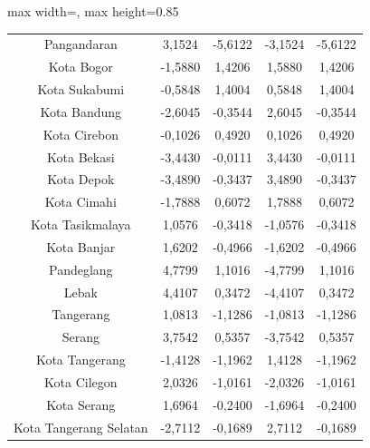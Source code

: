 \begin{table}[H]
\begin{adjustbox}{max width=\textwidth, max height=0.85\textheight}
\begin{tabular}{|c|c|c|c|c|}
Pangandaran & 3,1524 & -5,6122 & -3,1524 & -5,6122 \\
Kota Bogor & -1,5880 & 1,4206 & 1,5880 & 1,4206 \\
Kota Sukabumi & -0,5848 & 1,4004 & 0,5848 & 1,4004 \\
Kota Bandung & -2,6045 & -0,3544 & 2,6045 & -0,3544 \\
Kota Cirebon & -0,1026 & 0,4920 & 0,1026 & 0,4920 \\
Kota Bekasi & -3,4430 & -0,0111 & 3,4430 & -0,0111 \\
Kota Depok & -3,4890 & -0,3437 & 3,4890 & -0,3437 \\
Kota Cimahi & -1,7888 & 0,6072 & 1,7888 & 0,6072 \\
Kota Tasikmalaya & 1,0576 & -0,3418 & -1,0576 & -0,3418 \\
Kota Banjar & 1,6202 & -0,4966 & -1,6202 & -0,4966 \\
Pandeglang & 4,7799 & 1,1016 & -4,7799 & 1,1016 \\
Lebak & 4,4107 & 0,3472 & -4,4107 & 0,3472 \\
Tangerang & 1,0813 & -1,1286 & -1,0813 & -1,1286 \\
Serang & 3,7542 & 0,5357 & -3,7542 & 0,5357 \\
Kota Tangerang & -1,4128 & -1,1962 & 1,4128 & -1,1962 \\
Kota Cilegon & 2,0326 & -1,0161 & -2,0326 & -1,0161 \\
Kota Serang & 1,6964 & -0,2400 & -1,6964 & -0,2400 \\
Kota Tangerang Selatan & -2,7112 & -0,1689 & 2,7112 & -0,1689 \\
\hline
\end{tabular}
\end{adjustbox}
\end{table}